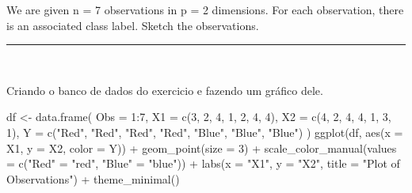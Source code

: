 \documentclass[
  a4paperpaper,
]{article}
\newenvironment{Shaded}{\begin{snugshade}}{\end{snugshade}}
\newcommand{\AttributeTok}[1]{\textcolor[rgb]{0.40,0.45,0.13}{#1}}
\newcommand{\DecValTok}[1]{\textcolor[rgb]{0.68,0.00,0.00}{#1}}
\newcommand{\FunctionTok}[1]{\textcolor[rgb]{0.28,0.35,0.67}{#1}}
\newcommand{\NormalTok}[1]{\textcolor[rgb]{0.00,0.23,0.31}{#1}}
\newcommand{\OtherTok}[1]{\textcolor[rgb]{0.00,0.23,0.31}{#1}}
\newcommand{\SpecialCharTok}[1]{\textcolor[rgb]{0.37,0.37,0.37}{#1}}
\newcommand{\StringTok}[1]{\textcolor[rgb]{0.13,0.47,0.30}{#1}}
\begin{document}
We are given n = 7 observations in p = 2 dimensions. For each
observation, there is an associated class label. Sketch the
observations.

\begin{center}\rule{0.5\linewidth}{0.5pt}\end{center}

~

Criando o banco de dados do exercicio e fazendo um gráfico dele.

\begin{Shaded}
\begin{Highlighting}[]
\NormalTok{df }\OtherTok{\textless{}{-}} \FunctionTok{data.frame}\NormalTok{(}
  \AttributeTok{Obs =} \DecValTok{1}\SpecialCharTok{:}\DecValTok{7}\NormalTok{,}
  \AttributeTok{X1 =} \FunctionTok{c}\NormalTok{(}\DecValTok{3}\NormalTok{, }\DecValTok{2}\NormalTok{, }\DecValTok{4}\NormalTok{, }\DecValTok{1}\NormalTok{, }\DecValTok{2}\NormalTok{, }\DecValTok{4}\NormalTok{, }\DecValTok{4}\NormalTok{),}
  \AttributeTok{X2 =} \FunctionTok{c}\NormalTok{(}\DecValTok{4}\NormalTok{, }\DecValTok{2}\NormalTok{, }\DecValTok{4}\NormalTok{, }\DecValTok{4}\NormalTok{, }\DecValTok{1}\NormalTok{, }\DecValTok{3}\NormalTok{, }\DecValTok{1}\NormalTok{),}
  \AttributeTok{Y =} \FunctionTok{c}\NormalTok{(}\StringTok{"Red"}\NormalTok{, }\StringTok{"Red"}\NormalTok{, }\StringTok{"Red"}\NormalTok{, }\StringTok{"Red"}\NormalTok{, }\StringTok{"Blue"}\NormalTok{, }\StringTok{"Blue"}\NormalTok{, }\StringTok{"Blue"}\NormalTok{)}
\NormalTok{)}
\FunctionTok{ggplot}\NormalTok{(df, }\FunctionTok{aes}\NormalTok{(}\AttributeTok{x =}\NormalTok{ X1, }\AttributeTok{y =}\NormalTok{ X2, }\AttributeTok{color =}\NormalTok{ Y)) }\SpecialCharTok{+}
  \FunctionTok{geom\_point}\NormalTok{(}\AttributeTok{size =} \DecValTok{3}\NormalTok{) }\SpecialCharTok{+}
  \FunctionTok{scale\_color\_manual}\NormalTok{(}\AttributeTok{values =} \FunctionTok{c}\NormalTok{(}\StringTok{"Red"} \OtherTok{=} \StringTok{"red"}\NormalTok{, }\StringTok{"Blue"} \OtherTok{=} \StringTok{"blue"}\NormalTok{)) }\SpecialCharTok{+}
  \FunctionTok{labs}\NormalTok{(}\AttributeTok{x =} \StringTok{"X1"}\NormalTok{, }\AttributeTok{y =} \StringTok{"X2"}\NormalTok{, }\AttributeTok{title =} \StringTok{"Plot of Observations"}\NormalTok{) }\SpecialCharTok{+}
  \FunctionTok{theme\_minimal}\NormalTok{()}
\end{Highlighting}
\end{Shaded}
\end{document}
